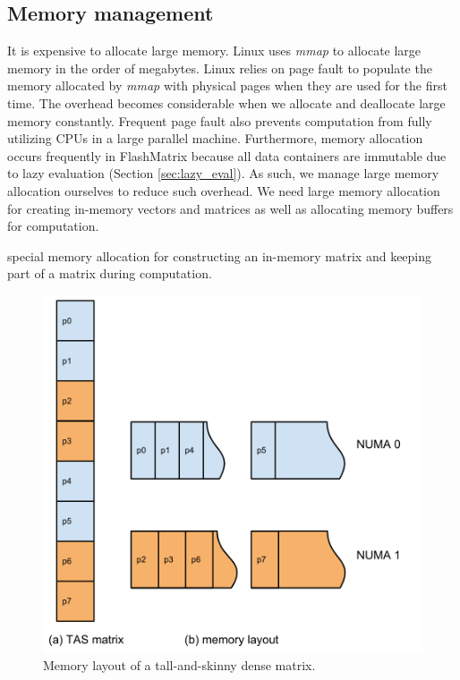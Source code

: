\subsection{Memory management} \label{sec:mem}
It is expensive to allocate large memory. Linux uses \textit{mmap} to allocate
large memory in the order of megabytes. Linux relies on page fault to populate 
the memory allocated by \textit{mmap} with physical pages when they are used
for the first time.
The overhead becomes considerable when we allocate and deallocate large memory
constantly. Frequent page fault also prevents computation from fully utilizing
CPUs in a large parallel machine. Furthermore, memory allocation occurs frequently
in FlashMatrix because all data containers are immutable due to lazy evaluation
(Section \ref{sec:lazy_eval}). As such, we manage large memory allocation
ourselves to reduce such overhead. We need large memory allocation for creating
in-memory vectors and matrices as well as allocating memory buffers for
computation.

special memory allocation for constructing an in-memory matrix and keeping part
of a matrix during computation.

\begin{figure}
	\centering
	\includegraphics[scale=0.5]{./matrix_mem.pdf}
	\caption{Memory layout of a tall-and-skinny dense matrix.}
	\label{fig:mat_mem}
\end{figure}

